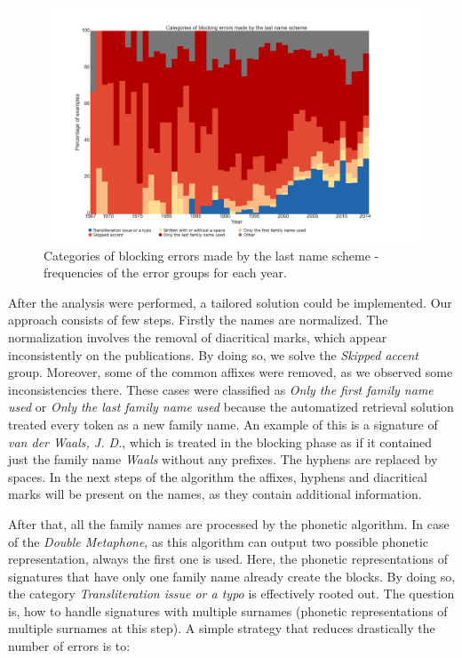 \documentclass{pracamgr}
\begin{document}
\begin{figure}
\includegraphics[width=\textwidth]{figures/blockerrors}
\caption{Categories of blocking errors made by the last name scheme - frequencies
of the error groups for each year.}
\label{fig:blockerrors}
\end{figure}

After the analysis were performed, a tailored solution could be implemented. Our approach
consists of few steps. Firstly the names are normalized. The normalization involves
the removal of diacritical marks, which appear inconsistently on the publications.
By doing so, we solve the \textit{Skipped accent} group. Moreover, some of the common
affixes were removed, as we observed some inconsistencies there. These cases were
classified as \textit{Only the first family name used} or \textit{Only the last family
name used} because the automatized retrieval solution treated every token as a new
family name. An example of this is a signature of \textit{van der Waals, J. D.}, which is
treated in the blocking phase as if it contained just the family name \textit{Waals} without
any prefixes. The hyphens are replaced by spaces. In the next steps of the algorithm
the affixes, hyphens and diacritical marks will be present on the names, as they
contain additional information.

After that, all the family names are processed by the phonetic algorithm. In case of
the \textit{Double Metaphone}, as this algorithm can output two possible phonetic
representation, always the first one is used. Here, the phonetic representations
of signatures that have only one family name already create the blocks. By doing so, the
category \textit{Transliteration issue or a typo} is effectively rooted out. 
The question is, how to handle signatures with multiple surnames (phonetic representations
of multiple surnames at this step). A simple strategy that reduces drastically the number 
of errors is to:
\end{document}
